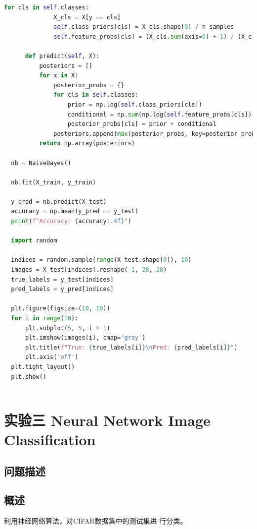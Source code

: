 \documentclass[12pt]{article}
\begin{document}
\begin{lstlisting}[language=Python]
          for cls in self.classes:
              X_cls = X[y == cls]
              self.class_priors[cls] = X_cls.shape[0] / n_samples
              self.feature_probs[cls] = (X_cls.sum(axis=0) + 1) / (X_cls.shape[0] + 2)
  
      def predict(self, X):
          posteriors = []
          for x in X:
              posterior_probs = {}
              for cls in self.classes:
                  prior = np.log(self.class_priors[cls])
                  conditional = np.sum(np.log(self.feature_probs[cls]) * x + np.log(1 - self.feature_probs[cls]) * (1 - x))
                  posterior_probs[cls] = prior + conditional
              posteriors.append(max(posterior_probs, key=posterior_probs.get))
          return np.array(posteriors)
  
  nb = NaiveBayes()
  
  nb.fit(X_train, y_train)
  
  y_pred = nb.predict(X_test)
  accuracy = np.mean(y_pred == y_test)
  print(f"Accuracy: {accuracy:.4f}")
  
  import random
  
  indices = random.sample(range(X_test.shape[0]), 10)
  images = X_test[indices].reshape(-1, 28, 28)
  true_labels = y_test[indices]
  pred_labels = y_pred[indices]
  
  plt.figure(figsize=(10, 10))
  for i in range(10):
      plt.subplot(5, 5, i + 1)
      plt.imshow(images[i], cmap='gray')
      plt.title(f"True: {true_labels[i]}\nPred: {pred_labels[i]}")
      plt.axis('off')
  plt.tight_layout()
  plt.show()
  
\end{lstlisting}

\newpage
\section{\centering 实验三 Neural Network Image Classification}

\subsection{问题描述}
\subsection{概述}
利用神经网络算法，对CIFAR数据集中的测试集进
行分类。
\end{document}
